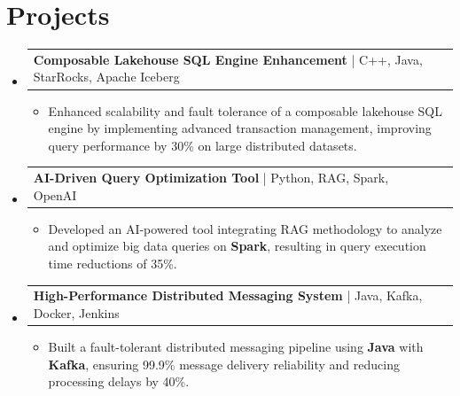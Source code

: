 \documentclass[letterpaper,10pt]{article}
\makeatletter
\newcommand{\resumeItem}[1]{
  \item{\fontsize{8pt}{9pt}\selectfont
    #1 \vspace{-3pt}
  }
}
\newcommand{\resumeProjectHeading}[2]{
    \item
    \begin{tabular*}{1.001\textwidth}{l@{\extracolsep{\fill}}r}
      \fontsize{8.5pt}{10pt}#1 & \textbf{\fontsize{8.5pt}{10pt} #2}\\
    \end{tabular*}\vspace{-7pt}
}
\newcommand{\resumeSubHeadingListStart}{\begin{itemize}[leftmargin=0pt, label={}]}
\newcommand{\resumeSubHeadingListEnd}{\end{itemize}}
\newcommand{\resumeItemListStart}{\begin{itemize}[leftmargin=*]}
\newcommand{\resumeItemListEnd}{\end{itemize}\vspace{-5pt}}
\makeatother
\begin{document}
\section{Projects}
    \vspace{-5pt}
    \resumeSubHeadingListStart
          \resumeProjectHeading
            {\textbf{Composable Lakehouse SQL Engine Enhancement} | C++, Java, StarRocks, Apache Iceberg}{}
            \resumeItemListStart
                \resumeItem{Enhanced scalability and fault tolerance of a composable lakehouse SQL engine by implementing advanced transaction management, improving query performance by 30\% on large distributed datasets.}
            \resumeItemListEnd
        \vspace{-12pt}
    
        \resumeProjectHeading
            {\textbf{AI-Driven Query Optimization Tool} | Python, RAG, Spark, OpenAI}{}
        \resumeItemListStart
                \resumeItem{Developed an AI-powered tool integrating RAG methodology to analyze and optimize big data queries on \textbf{Spark}, resulting in query execution time reductions of 35\%.}
        \resumeItemListEnd
      \vspace{-12pt}
      \resumeProjectHeading
        {\textbf{High-Performance Distributed Messaging System} | Java, Kafka, Docker, Jenkins}{}
    \resumeItemListStart
            \resumeItem{Built a fault-tolerant distributed messaging pipeline using \textbf{Java} with \textbf{Kafka}, ensuring 99.9\% message delivery reliability and reducing processing delays by 40\%.}
    \resumeItemListEnd
    \resumeSubHeadingListEnd
\end{document}
